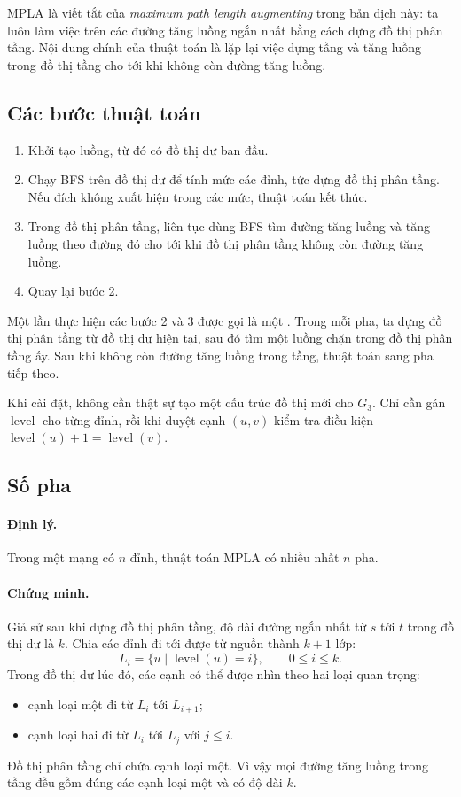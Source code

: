 \documentclass[11pt]{article}
\newcommand{\level}{\operatorname{level}}
\begin{document}
MPLA là viết tắt của \emph{maximum path length augmenting} trong bản dịch này:
ta luôn làm việc trên các đường tăng luồng ngắn nhất bằng cách dựng đồ thị
phân tầng. Nội dung chính của thuật toán là lặp lại việc dựng tầng và tăng
luồng trong đồ thị tầng cho tới khi không còn đường tăng luồng.

\subsection{Các bước thuật toán}

\begin{enumerate}
  \item Khởi tạo luồng, từ đó có đồ thị dư ban đầu.
  \item Chạy BFS trên đồ thị dư để tính mức các đỉnh, tức dựng đồ thị phân
  tầng. Nếu đích không xuất hiện trong các mức, thuật toán kết thúc.
  \item Trong đồ thị phân tầng, liên tục dùng BFS tìm đường tăng luồng và tăng
  luồng theo đường đó cho tới khi đồ thị phân tầng không còn đường tăng luồng.
  \item Quay lại bước 2.
\end{enumerate}

Một lần thực hiện các bước 2 và 3 được gọi là một . Trong mỗi pha,
ta dựng đồ thị phân tầng từ đồ thị dư hiện tại, sau đó tìm một luồng chặn
trong đồ thị phân tầng ấy. Sau khi không còn đường tăng luồng trong tầng,
thuật toán sang pha tiếp theo.

Khi cài đặt, không cần thật sự tạo một cấu trúc đồ thị mới cho \(G_3\). Chỉ cần
gán \(\level\) cho từng đỉnh, rồi khi duyệt cạnh \((u,v)\) kiểm tra điều kiện
\(\level(u)+1=\level(v)\).

\subsection{Số pha}

\paragraph{Định lý.}
Trong một mạng có \(n\) đỉnh, thuật toán MPLA có nhiều nhất \(n\) pha.

\paragraph{Chứng minh.}
Giả sử sau khi dựng đồ thị phân tầng, độ dài đường ngắn nhất từ \(s\) tới
\(t\) trong đồ thị dư là \(k\). Chia các đỉnh đi tới được từ nguồn thành
\(k+1\) lớp:
\[
  L_i=\{u\mid \level(u)=i\},\qquad 0\le i\le k.
\]
Trong đồ thị dư lúc đó, các cạnh có thể được nhìn theo hai loại quan trọng:
\begin{itemize}
  \item cạnh loại một đi từ \(L_i\) tới \(L_{i+1}\);
  \item cạnh loại hai đi từ \(L_i\) tới \(L_j\) với \(j\le i\).
\end{itemize}
Đồ thị phân tầng chỉ chứa cạnh loại một. Vì vậy mọi đường tăng luồng trong
tầng đều gồm đúng các cạnh loại một và có độ dài \(k\).
\end{document}

